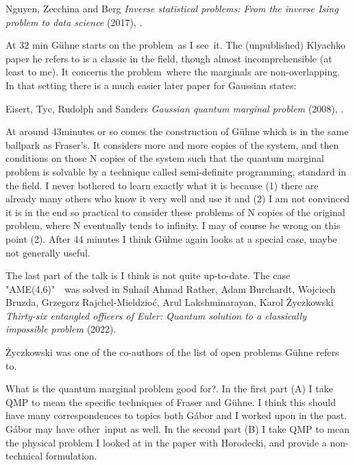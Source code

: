 \begin{description}
Nguyen, Zecchina and Berg
{\em Inverse statistical problems: {From} the inverse {Ising} problem to data science}
(2017), .

At 32 min G\"{u}hne starts on the problem as I see it.
The (unpublished) Klyachko paper he refers to is a classic in
the field, though almost incomprehensible (at least to me). It concerns the
problem where the marginals are non-overlapping. In that setting there is a
much easier later paper for Gaussian states:

Eisert, Tyc, Rudolph and Sanders
{\em Gaussian quantum marginal problem} (2008), . 

At around 43minutes or so comes the construction of G\"{u}hne which is in the
same ballpark as Fraser's. It considers more and more copies of the system,
and then conditions on those N copies of the system such that the quantum
marginal problem is solvable by a technique called semi-definite programming,
standard in the field. I never bothered to learn exactly what it is because
(1) there are already many others who know it very well and use it and (2) I
am not convinced it is in the end so practical to consider these problems of
N copies of the original problem, where N eventually tends to infinity. I may
of course be wrong on this point (2). After 44 minutes I think G\"{u}hne again
looks at a special case, maybe not generally useful.

The last part of the talk is I think is not quite
up-to-date. The case "AME(4,6)"  was solved in
%
    Suhail Ahmad Rather, Adam Burchardt, Wojciech Bruzda, Grzegorz
    Rajchel-Mieldzio\'c, Arul Lakshminarayan, Karol {\.{Z}}yczkowski
    {\em Thirty-six entangled officers of Euler: Quantum solution to a
    classically impossible problem} (2022).

{\.{Z}}yczkowski
was one of the co-authors of the list of open problems G\"{u}hne refers to.

\item[2023-01-03 Erik]
What is the quantum marginal problem good for?. In the first part (A) I take
QMP to mean the specific techniques of Fraser and G\"{u}hne. I think this
should have many correspondences to topics both G{\'a}bor and I worked upon
in the past. G{\'a}bor may have other input as well. In the second part (B) I
take QMP to mean the physical problem I looked at in the paper with
Horodecki, and provide a non-technical formulation.

\medskip


\end{description}
